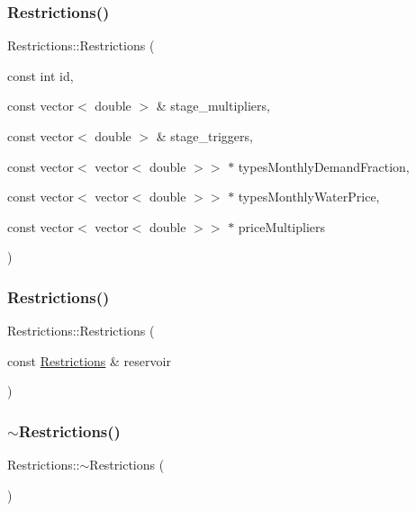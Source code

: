 \subsubsection{\texorpdfstring{Restrictions()}{Restrictions()}\hspace{0.1cm}{\footnotesize\ttfamily [2/3]}}
{\footnotesize\ttfamily Restrictions\+::\+Restrictions (\begin{DoxyParamCaption}\item[{const int}]{id,  }\item[{const vector$<$ double $>$ \&}]{stage\+\_\+multipliers,  }\item[{const vector$<$ double $>$ \&}]{stage\+\_\+triggers,  }\item[{const vector$<$ vector$<$ double $>$$>$ $\ast$}]{types\+Monthly\+Demand\+Fraction,  }\item[{const vector$<$ vector$<$ double $>$$>$ $\ast$}]{types\+Monthly\+Water\+Price,  }\item[{const vector$<$ vector$<$ double $>$$>$ $\ast$}]{price\+Multipliers }\end{DoxyParamCaption})}

\mbox{\label{classRestrictions_aa8653b70ff7eedb4e8fc1b21ebf2ead9}} 
\subsubsection{\texorpdfstring{Restrictions()}{Restrictions()}\hspace{0.1cm}{\footnotesize\ttfamily [3/3]}}
{\footnotesize\ttfamily Restrictions\+::\+Restrictions (\begin{DoxyParamCaption}\item[{const \mbox{\hyperlink{classRestrictions}{Restrictions}} \&}]{reservoir }\end{DoxyParamCaption})}

\mbox{\label{classRestrictions_a54c8a857a2beed78d34a46c36951b004}} 
\subsubsection{\texorpdfstring{$\sim$\+Restrictions()}{~Restrictions()}}
{\footnotesize\ttfamily Restrictions\+::$\sim$\+Restrictions (\begin{DoxyParamCaption}{ }\end{DoxyParamCaption})}




